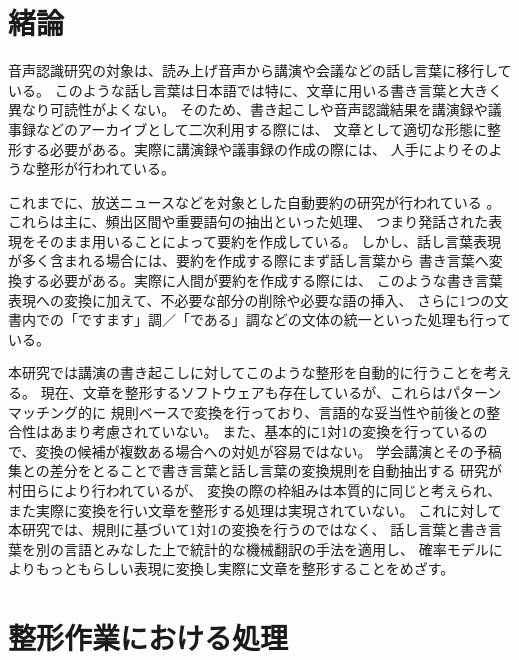 

\maketitle



\section{緒論}

音声認識研究の対象は、読み上げ音声から講演や会議などの話し言葉に移行している。
このような話し言葉は日本語では特に、文章に用いる書き言葉と大きく異なり可読性がよくない。
そのため、書き起こしや音声認識結果を講演録や議事録などのアーカイブとして二次利用する際には、
文章として適切な形態に整形する必要がある。実際に講演録や議事録の作成の際には、
人手によりそのような整形が行われている。

これまでに、放送ニュースなどを対象とした自動要約の研究が行われている
\cite{98-NL-126-10,98-NL-126-9,SP96-28,99-SLP-29-18,SP2000-116}。
これらは主に、頻出区間や重要語句の抽出といった処理、
つまり発話された表現をそのまま用いることによって要約を作成している。
しかし、話し言葉表現が多く含まれる場合には、要約を作成する際にまず話し言葉から
書き言葉へ変換する必要がある。実際に人間が要約を作成する際には、
このような書き言葉表現への変換に加えて、不必要な部分の削除や必要な語の挿入、
さらに1つの文書内での「ですます」調／「である」調などの文体の統一といった処理も行っている。

本研究では講演の書き起こしに対してこのような整形を自動的に行うことを考える。
現在、文章を整形するソフトウェアも存在しているが、これらはパターンマッチング的に
規則ベースで変換を行っており、言語的な妥当性や前後との整合性はあまり考慮されていない。
また、基本的に1対1の変換を行っているので、変換の候補が複数ある場合への対処が容易ではない。
学会講演とその予稿集との差分をとることで書き言葉と話し言葉の変換規則を自動抽出する
研究が村田らにより行われている\cite{murata_nl2002_diff,murata_nl2001_henkei}が、
変換の際の枠組みは本質的に同じと考えられ、また実際に変換を行い文章を整形する処理は実現されていない。
これに対して本研究では、規則に基づいて1対1の変換を行うのではなく、
話し言葉と書き言葉を別の言語とみなした上で統計的な機械翻訳の手法を適用し、
確率モデルによりもっともらしい表現に変換し実際に文章を整形することをめざす。

\section{整形作業における処理}

